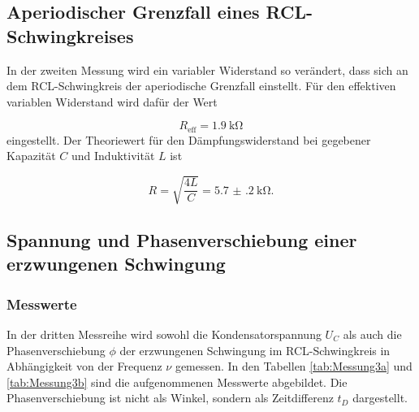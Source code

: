 \subsection{Aperiodischer Grenzfall eines RCL-Schwingkreises}

In der zweiten Messung wird ein variabler Widerstand so verändert, dass
sich an dem RCL-Schwingkreis der aperiodische Grenzfall einstellt.
Für den effektiven variablen Widerstand wird dafür der Wert

\begin{equation}
  R_\text{eff} = \SI{1.9}{\kilo\ohm}
\end{equation}
eingestellt.
Der Theoriewert für den Dämpfungswiderstand bei gegebener Kapazität $C$ und
Induktivität $L$ ist

\begin{equation}
  R = \sqrt{\frac{4L}{C}} = \SI{5.7(2)}{\kilo\ohm}.
\end{equation}


\subsection{Spannung und Phasenverschiebung
einer erzwungenen Schwingung}

\subsubsection{Messwerte}

In der dritten Messreihe wird sowohl die Kondensatorspannung $U_C$ als auch die
Phasenverschiebung $\phi$ der erzwungenen Schwingung im RCL-Schwingkreis in
Abhängigkeit von der Frequenz $\nu$ gemessen.
In den Tabellen \ref{tab:Messung3a} und \ref{tab:Messung3b}
sind die aufgenommenen Messwerte abgebildet.
Die Phasenverschiebung ist nicht als Winkel, sondern als Zeitdifferenz $t_D$
dargestellt.

